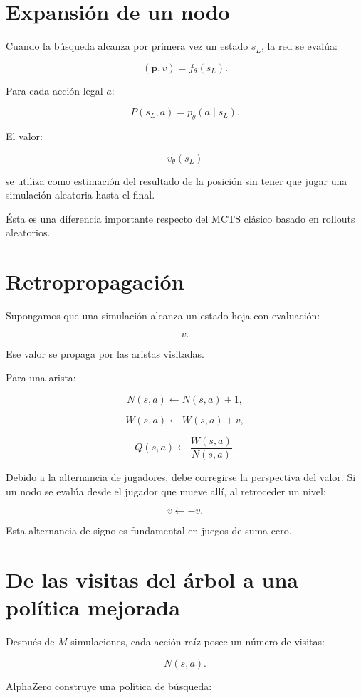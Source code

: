 \documentclass[11pt,a4paper]{article}
\begin{document}
\section{Expansión de un nodo}

Cuando la búsqueda alcanza por primera vez un estado \(s_L\), la red se evalúa:

\[
(\bm{p},v)
=
f_\theta(s_L).
\]

Para cada acción legal \(a\):

\[
P(s_L,a)
=
p_\theta(a\mid s_L).
\]

El valor:

\[
v_\theta(s_L)
\]

se utiliza como estimación del resultado de la posición sin tener que jugar una simulación aleatoria hasta el final.

Ésta es una diferencia importante respecto del MCTS clásico basado en rollouts aleatorios.

\section{Retropropagación}

Supongamos que una simulación alcanza un estado hoja con evaluación:

\[
v.
\]

Ese valor se propaga por las aristas visitadas.

Para una arista:

\[
N(s,a)
\leftarrow
N(s,a)+1,
\]

\[
W(s,a)
\leftarrow
W(s,a)+v,
\]

\[
Q(s,a)
\leftarrow
\frac{W(s,a)}{N(s,a)}.
\]

Debido a la alternancia de jugadores, debe corregirse la perspectiva del valor. Si un nodo se evalúa desde el jugador que mueve allí, al retroceder un nivel:

\[
v \leftarrow -v.
\]

Esta alternancia de signo es fundamental en juegos de suma cero.

\section{De las visitas del árbol a una política mejorada}

Después de \(M\) simulaciones, cada acción raíz posee un número de visitas:

\[
N(s,a).
\]

AlphaZero construye una política de búsqueda:
\end{document}
